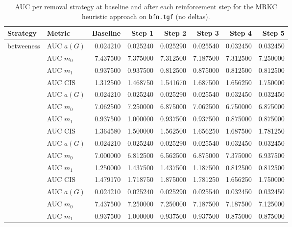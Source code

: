 
\begin{table}[htbp]
  \centering
  \caption{AUC per removal strategy at baseline and after each reinforcement step for the MRKC heuristic approach on \texttt{bfn.tgf} (no deltas).}
  \label{tab:bfn-mrkc_heuristic-auc}
  \begin{tabular}{llrrrrrr}
    \toprule
    \textbf{Strategy} & \textbf{Metric} & \textbf{Baseline} & \textbf{Step 1} & \textbf{Step 2} & \textbf{Step 3} & \textbf{Step 4} & \textbf{Step 5} \\
    \midrule
    \multirow{4}{*}{betweeness} & AUC $a(G)$ & 0.024210 & 0.025240 & 0.025290 & 0.025540 & 0.032450 & 0.032450 \\
    & AUC $m_0$ & 7.437500 & 7.375000 & 7.312500 & 7.187500 & 7.312500 & 7.250000 \\
    & AUC $m_1$ & 0.937500 & 0.937500 & 0.812500 & 0.875000 & 0.812500 & 0.812500 \\
    & AUC CIS & 1.312500 & 1.468750 & 1.541670 & 1.687500 & 1.656250 & 1.750000 \\
    \addlinespace
    \multirow{4}{*}{closeness} & AUC $a(G)$ & 0.024210 & 0.025240 & 0.025290 & 0.025540 & 0.032450 & 0.032450 \\
    & AUC $m_0$ & 7.062500 & 7.250000 & 6.875000 & 7.062500 & 6.750000 & 6.875000 \\
    & AUC $m_1$ & 0.937500 & 1.000000 & 0.937500 & 0.937500 & 0.875000 & 0.875000 \\
    & AUC CIS & 1.364580 & 1.500000 & 1.562500 & 1.656250 & 1.687500 & 1.781250 \\
    \addlinespace
    \multirow{4}{*}{core influence} & AUC $a(G)$ & 0.024210 & 0.025240 & 0.025290 & 0.025540 & 0.032450 & 0.032450 \\
    & AUC $m_0$ & 7.000000 & 6.812500 & 6.562500 & 6.875000 & 7.375000 & 6.937500 \\
    & AUC $m_1$ & 1.250000 & 1.437500 & 1.437500 & 1.187500 & 0.812500 & 0.812500 \\
    & AUC CIS & 1.479170 & 1.718750 & 1.875000 & 1.781250 & 1.656250 & 1.750000 \\
    \addlinespace
    \multirow{4}{*}{degree} & AUC $a(G)$ & 0.024210 & 0.025240 & 0.025290 & 0.025540 & 0.032450 & 0.032450 \\
    & AUC $m_0$ & 7.437500 & 7.250000 & 7.250000 & 7.187500 & 7.187500 & 7.125000 \\
    & AUC $m_1$ & 0.937500 & 1.000000 & 0.937500 & 0.937500 & 0.875000 & 0.875000 \\

\end{tabular}
\end{table}
